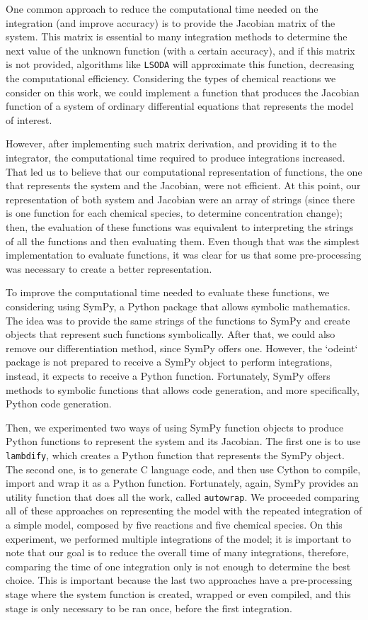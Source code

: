One common approach to reduce the computational time needed on the
integration (and improve accuracy) is to provide the Jacobian matrix of
the system. This matrix is essential to many integration methods to
determine the next value of the unknown function (with a certain
accuracy), and if this matrix is not provided, algorithms like 
{\tt LSODA} will approximate this function, decreasing the computational 
efficiency. Considering the types of chemical reactions we consider on
this work, we could implement a function that produces the Jacobian
function of a system of ordinary differential equations that represents
the model of interest.

However, after implementing such matrix derivation, and providing it to
the integrator, the computational time required to produce integrations
increased. That led us to believe that our computational representation 
of functions, the one that represents the system and the Jacobian, were 
not efficient. At this point, our representation of both system and
Jacobian were an array of strings (since there is one function for each
chemical species, to determine concentration change); then, the 
evaluation of these functions was equivalent to interpreting the strings
of all the functions and then evaluating them. Even though that was the
simplest implementation to evaluate functions, it was clear for us that
some pre-processing was necessary to create a better representation.

To improve the computational time needed to evaluate these functions, we
considering using SymPy, a Python package that allows symbolic
mathematics. The idea was to provide the same strings of the functions
to SymPy and create objects that represent such functions symbolically. 
After that, we could also remove our differentiation method, since SymPy
offers one. However, the `odeint` package is not prepared to receive a 
SymPy object to perform integrations, instead, it expects to receive a 
Python function. Fortunately, SymPy offers methods to symbolic functions 
that allows code generation, and more specifically, Python code
generation.

Then, we experimented two ways of using SymPy function objects to 
produce Python functions to represent the system and its Jacobian. The 
first one is to use {\tt lambdify}, which creates a Python function that 
represents  the SymPy object. The second one, is to generate C language 
code, and then use Cython to compile, import and wrap it as a Python 
function. Fortunately, again, SymPy provides an utility function that 
does all the work, called {\tt autowrap}. We proceeded comparing all of 
these approaches on representing the model with the repeated integration 
of a simple model, composed by five reactions and five chemical species. 
On this experiment, we performed multiple integrations of the model; it 
is important to note that our goal is to reduce the overall time of many
integrations, therefore, comparing the time of one integration only is
not enough to determine the best choice. This is important because the
last two approaches have a pre-processing stage where the system
function is created, wrapped or even compiled, and this stage is only
necessary to be ran once, before the first integration.


